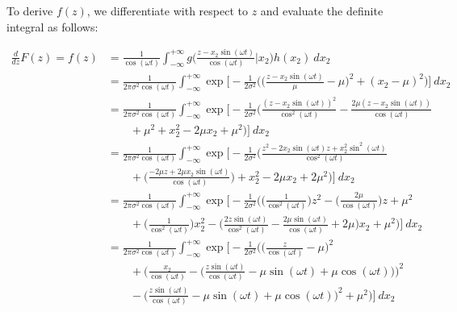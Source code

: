 \documentclass[10pt, oneside]{article}
\begin{document}
\begin{enumerate}[label=9.\arabic*]
\begin{enumerate}
To derive $f(z)$, we differentiate with respect to $z$ and evaluate the definite integral as follows:

	\begin{align*}
	\frac{d}{dz} F(z) = f(z) &= \frac{1}{\cos (\omega t)} \int^{+\infty}_{-\infty} g \bigg( \frac{z - x_2 \sin (\omega t) }{\cos (\omega t)} \bigg| x_2 \bigg) h(x_2) \ dx_2 \\
	&= \frac{1}{2 \pi \sigma^2 \cos (\omega t)} \int^{+\infty}_{-\infty} \exp \bigg[ -\frac{1}{2 \sigma^2} \bigg( \bigg( \frac{z - x_2 \sin(\omega t)}{\mu} - \mu \bigg)^2 + (x_2 - \mu)^2 \bigg) \bigg] \ dx_2\\
	&= \frac{1}{2 \pi \sigma^2 \cos (\omega t)} \int^{+\infty}_{-\infty} \exp \bigg[ -\frac{1}{2 \sigma^2} \bigg( \frac{(z - x_2 \sin(\omega t))^2}{\cos^2(\omega t)} - \frac{2\mu (z - x_2 \sin(\omega t))}{\cos(\omega t)} \\
	&\quad \quad + \mu^2 + x^2_2 - 2\mu x_2 + \mu^2 \bigg) \bigg] \ dx_2 \\
	&= \frac{1}{2 \pi \sigma^2 \cos (\omega t)} \int^{+\infty}_{-\infty} \exp \bigg[ -\frac{1}{2 \sigma^2} \bigg( \frac{z^2 - 2x_2 \sin(\omega t) z + x^2_2 \sin^2(\omega t)}{\cos^2(\omega t)} \\ 
	&\quad \quad + \bigg( \frac{-2\mu z + 2\mu x_2 \sin(\omega t)}{\cos(\omega t)} \bigg) + x^2_2 - 2\mu x_2 + 2\mu^2 \bigg) \bigg] \ dx_2 \\
	&= \frac{1}{2 \pi \sigma^2 \cos (\omega t)} \int^{+\infty}_{-\infty} \exp \bigg[ -\frac{1}{2 \sigma^2} \bigg( \bigg( \frac{1}{\cos^2(\omega t)} \bigg) z^2 - \bigg( \frac{2\mu}{\cos(\omega t)} \bigg) z + \mu^2 \\
	&\quad \quad + \bigg( \frac{1}{\cos^2(\omega t)} \bigg) x^2_2 - \bigg( \frac{2z \sin(\omega t)}{\cos^2(\omega t)} - \frac{2\mu \sin (\omega t)}{\cos (\omega t)} + 2\mu \bigg) x_2 + \mu^2 \bigg) \bigg] \ dx_2 \\
	&= \frac{1}{2 \pi \sigma^2 \cos (\omega t)} \int^{+\infty}_{-\infty} \exp \bigg[ -\frac{1}{2 \sigma^2} \bigg( \bigg( \frac{z}{\cos(\omega t)} - \mu \bigg)^2 \\ 
	&\quad \quad + \bigg( \frac{x_2}{\cos(\omega t)} - \bigg( \frac{z \sin(\omega t)}{\cos(\omega t)} - \mu \sin(\omega t) + \mu \cos(\omega t) \bigg) \bigg)^2 \\
	&\quad \quad - \bigg( \frac{z \sin(\omega t)}{\cos(\omega t)} - \mu \sin(\omega t) + \mu \cos(\omega t) \bigg)^2 + \mu^2 \bigg) \bigg] \ dx_2 \\
	\end{align*}
	

\end{enumerate}
\end{enumerate}
\end{document}
